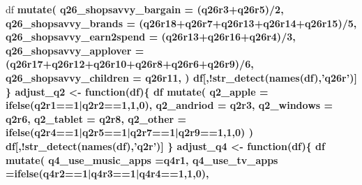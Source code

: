 \documentclass[]{article}
\newenvironment{Shaded}{\begin{snugshade}}{\end{snugshade}}
\newcommand{\KeywordTok}[1]{\textcolor[rgb]{0.13,0.29,0.53}{\textbf{#1}}}
\newcommand{\DataTypeTok}[1]{\textcolor[rgb]{0.13,0.29,0.53}{#1}}
\newcommand{\DecValTok}[1]{\textcolor[rgb]{0.00,0.00,0.81}{#1}}
\newcommand{\StringTok}[1]{\textcolor[rgb]{0.31,0.60,0.02}{#1}}
\newcommand{\ControlFlowTok}[1]{\textcolor[rgb]{0.13,0.29,0.53}{\textbf{#1}}}
\newcommand{\OperatorTok}[1]{\textcolor[rgb]{0.81,0.36,0.00}{\textbf{#1}}}
\newcommand{\NormalTok}[1]{#1}
\begin{document}
\begin{Shaded}
\begin{Highlighting}[]
{{{{\NormalTok{  df }\OperatorTok{%<>%}\StringTok{ }
\StringTok{    }\KeywordTok{mutate}\NormalTok{(}
      \DataTypeTok{q26_shopsavvy_bargain =}\NormalTok{  (q26r3}\OperatorTok{+}\NormalTok{q26r5)}\OperatorTok{/}\DecValTok{2}\NormalTok{,}
      \DataTypeTok{q26_shopsavvy_brands =}\NormalTok{ (q26r18}\OperatorTok{+}\NormalTok{q26r7}\OperatorTok{+}\NormalTok{q26r13}\OperatorTok{+}\NormalTok{q26r14}\OperatorTok{+}\NormalTok{q26r15)}\OperatorTok{/}\DecValTok{5}\NormalTok{,}
      \DataTypeTok{q26_shopsavvy_earn2spend =}\NormalTok{ (q26r13}\OperatorTok{+}\NormalTok{q26r16}\OperatorTok{+}\NormalTok{q26r4)}\OperatorTok{/}\DecValTok{3}\NormalTok{,}
      \DataTypeTok{q26_shopsavvy_applover =}\NormalTok{ (q26r17}\OperatorTok{+}\NormalTok{q26r12}\OperatorTok{+}\NormalTok{q26r10}\OperatorTok{+}\NormalTok{q26r8}\OperatorTok{+}\NormalTok{q26r6}\OperatorTok{+}\NormalTok{q26r9)}\OperatorTok{/}\DecValTok{6}\NormalTok{,}
      \DataTypeTok{q26_shopsavvy_children =}\NormalTok{ q26r11,}
\NormalTok{    )}
\NormalTok{  df[,}\OperatorTok{!}\KeywordTok{str_detect}\NormalTok{(}\KeywordTok{names}\NormalTok{(df),}\StringTok{'q26r'}\NormalTok{)]}
\NormalTok{\}}
\NormalTok{adjust_q2 <-}\StringTok{ }\ControlFlowTok{function}\NormalTok{(df)\{}
\NormalTok{  df }\OperatorTok{%<>%}
\StringTok{    }\KeywordTok{mutate}\NormalTok{(}
      \DataTypeTok{q2_apple =} \KeywordTok{ifelse}\NormalTok{(q2r1}\OperatorTok{==}\DecValTok{1}\OperatorTok{|}\NormalTok{q2r2}\OperatorTok{==}\DecValTok{1}\NormalTok{,}\DecValTok{1}\NormalTok{,}\DecValTok{0}\NormalTok{),}
      \DataTypeTok{q2_andriod =}\NormalTok{ q2r3,}
      \DataTypeTok{q2_windows =}\NormalTok{ q2r6,}
      \DataTypeTok{q2_tablet =}\NormalTok{ q2r8,}
      \DataTypeTok{q2_other =} \KeywordTok{ifelse}\NormalTok{(q2r4}\OperatorTok{==}\DecValTok{1}\OperatorTok{|}\NormalTok{q2r5}\OperatorTok{==}\DecValTok{1}\OperatorTok{|}\NormalTok{q2r7}\OperatorTok{==}\DecValTok{1}\OperatorTok{|}\NormalTok{q2r9}\OperatorTok{==}\DecValTok{1}\NormalTok{,}\DecValTok{1}\NormalTok{,}\DecValTok{0}\NormalTok{)}
\NormalTok{    )}
\NormalTok{  df[,}\OperatorTok{!}\KeywordTok{str_detect}\NormalTok{(}\KeywordTok{names}\NormalTok{(df),}\StringTok{'q2r'}\NormalTok{)]}
\NormalTok{\}}
\NormalTok{adjust_q4 <-}\StringTok{ }\ControlFlowTok{function}\NormalTok{(df)\{}
\NormalTok{    df }\OperatorTok{%<>%}
\StringTok{    }\KeywordTok{mutate}\NormalTok{(}
      \DataTypeTok{q4_use_music_apps =}\NormalTok{q4r1,}
      \DataTypeTok{q4_use_tv_apps =}\KeywordTok{ifelse}\NormalTok{(q4r2}\OperatorTok{==}\DecValTok{1}\OperatorTok{|}\NormalTok{q4r3}\OperatorTok{==}\DecValTok{1}\OperatorTok{|}\NormalTok{q4r4}\OperatorTok{==}\DecValTok{1}\NormalTok{,}\DecValTok{1}\NormalTok{,}\DecValTok{0}\NormalTok{),}
}}}}}}}
\end{Highlighting}
\end{Shaded}
\end{document}
